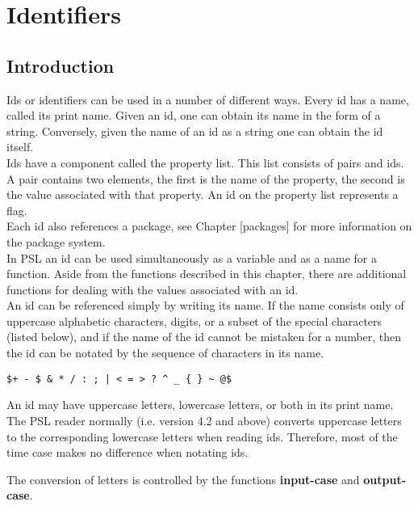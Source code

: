 \chapter*{Identifiers}

\section{Introduction}

Ids  or identifiers can be used in a number of different ways.
Every id has a name, called its print name.  Given  an  id,  one
can  obtain its name in the form of a string.  Conversely, given
the name of an id as a string one can obtain the id itself.\\


\noindent
Ids have a component called the  property  list.    This  list
consists  of  pairs  and ids.  A pair contains two elements, the
first is the name of the  property,  the  second  is  the  value
associated  with  that  property.    An  id on the property list
represents a flag.\\


\noindent
Each id also references a package, see Chapter [packages]  for
more information on the package system.\\


\noindent
In PSL an id can be used simultaneously as a variable and as a
name for a function.  Aside from the functions described in this
chapter,  there  are  additional  functions for dealing with the
values associated with an id.\\


\noindent
An id can be referenced simply by writing its name. If the
name  consists  only of uppercase alphabetic characters, digits,
or a subset of the special characters (listed below), and if the
name of the id cannot be mistaken for a number,  then the id can
be notated by the sequence of characters in its name.
\begin{center}
\begin{verbatim}
$+ - $ & * / : ; | < = > ? ^ _ { } ~ @$
\end{verbatim}
\end{center}
\noindent
An id may have uppercase letters, lowercase letters, or both  in
its  print  name. The  PSL reader normally (i.e. version 4.2 and
above) converts uppercase
letters to the corresponding lowercase letters when reading ids.
Therefore, most of the time case makes  no  difference  when
notating ids. 

The conversion of letters is controlled by the functions 
{\bf input-case} and {\bf output-case}.


